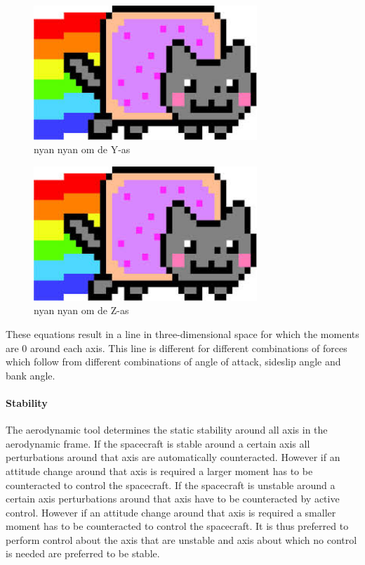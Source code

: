\begin{figure}
	\centering
	\includegraphics[width=0.75\textwidth]{./Figure/Nyan}
	\caption{nyan nyan om de Y-as}
	\label{fig:momy}
\end{figure}

\begin{figure}
	\centering
	\includegraphics[width=0.75\textwidth]{./Figure/Nyan}
	\caption{nyan nyan om de Z-as}
	\label{fig:momz}
\end{figure}

These equations result in a line in three-dimensional space for which the moments are 0 around each axis. This line is different for different combinations of forces which follow from different combinations of angle of attack, sideslip angle and bank angle.

\paragraph{Stability}
\label{control:stab}
The aerodynamic tool determines the static stability around all axis in the aerodynamic frame. If the spacecraft is stable around a certain axis all perturbations around that axis are automatically counteracted. However if an attitude change around that axis is required a larger moment has to be counteracted to control the spacecraft.  If the spacecraft is unstable around a certain axis perturbations around that axis have to be counteracted by active control. However if an attitude change around that axis is required a smaller moment has to be counteracted to control the spacecraft. It is thus preferred to perform control about the axis that are unstable and axis about which no control is needed are preferred to be stable.

